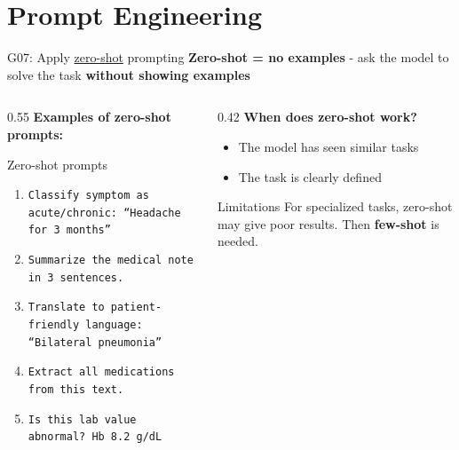 \documentclass[aspectratio=169, 10pt]{beamer}
\begin{document}
\section{Prompt Engineering}

\begin{frame}{G07: Apply \href{https://en.wikipedia.org/wiki/Zero-shot_learning}{zero-shot} prompting}
    \textbf{Zero-shot = no examples} - ask the model to solve the task \textbf{without showing examples}

    \vspace{0.1cm}
    \begin{columns}[T]
        \begin{column}{0.55\textwidth}
            \textbf{Examples of zero-shot prompts:}
            \begin{block}{\footnotesize Zero-shot prompts}
                \scriptsize
                \begin{enumerate}
                    \item \texttt{Classify symptom as acute/chronic: ``Headache for 3 months''}
                    \item \texttt{Summarize the medical note in 3 sentences.}
                    \item \texttt{Translate to patient-friendly language: ``Bilateral pneumonia''}
                    \item \texttt{Extract all medications from this text.}
                    \item \texttt{Is this lab value abnormal? Hb 8.2 g/dL}
                \end{enumerate}
            \end{block}
        \end{column}
        \begin{column}{0.42\textwidth}
            \textbf{When does zero-shot work?}
            \footnotesize
            \begin{itemize}
                \item The model has seen similar tasks
                \item The task is clearly defined
            \end{itemize}

            \vspace{0.1cm}
            \begin{alertblock}{\footnotesize Limitations}
                \scriptsize
                For specialized tasks, zero-shot may give poor results. Then \textbf{few-shot} is needed.
            \end{alertblock}
        \end{column}
    \end{columns}
\end{frame}
\end{document}
